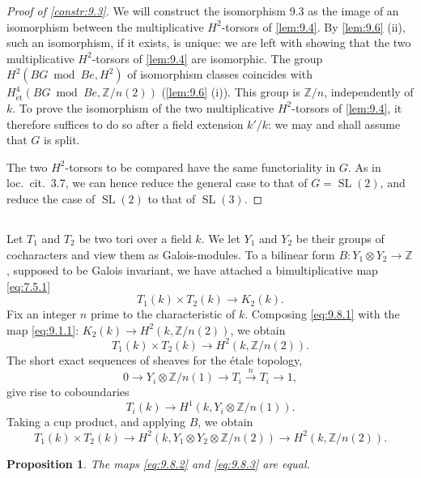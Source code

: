 \documentclass[11pt,a4paper]{article}
\theoremstyle{plain}
\newtheorem{proposition}[theorem]{Proposition}
\theoremstyle{definition}
\newcommand{\bZ}{\mathbb{Z}}
\DeclareMathOperator{\SL}{SL}
\newcommand{\et}{\mathrm{\acute{e}t}}
\begin{document}
\begin{proof}[Proof of \ref{constr:9.3}]
We will construct the isomorphism 9.3 as the image of an isomorphism between the multiplicative $H^2$-torsors of \ref{lem:9.4}. By \ref{lem:9.6} (ii), such an isomorphism, if it exists, is unique: we are left with showing that the two multiplicative $H^2$-torsors of \ref{lem:9.4} are isomorphic. The group $H^2(BG \bmod Be, H^2)$ of isomorphism classes coincides with $H^4_\et(BG \bmod Be, \bZ/n(2))$ (\ref{lem:9.6} (i)). This group is $\bZ/n$, independently of $k$. To prove the isomorphism of the two multiplicative $H^2$-torsors of \ref{lem:9.4}, it therefore suffices to do so after a field extension $k'/k$: we may and shall assume that $G$ is split.

The two $H^2$-torsors to be compared have the same functoriality in $G$. As in loc.~cit.~3.7, we can hence reduce the general case to that of $G = \SL(2)$, and reduce the case of $\SL(2)$ to that of $\SL(3)$.
\end{proof}

\subsection{}
Let $T_1$ and $T_2$ be two tori over a field $k$. We let $Y_1$ and $Y_2$ be their groups of cocharacters and view them as Galois-modules. To a bilinear form $B: Y_1 \otimes Y_2 \to \bZ$, supposed to be Galois invariant, we have attached a bimultiplicative map \eqref{eq:7.5.1}
\begin{equation}\label{eq:9.8.1}
T_1(k) \times T_2(k) \to K_2(k).
\end{equation}
Fix an integer $n$ prime to the characteristic of $k$. Composing \eqref{eq:9.8.1} with the map \eqref{eq:9.1.1}: $K_2(k) \to H^2(k, \bZ/n(2))$, we obtain
\begin{equation}\label{eq:9.8.2}
T_1(k) \times T_2(k) \to H^2(k, \bZ/n(2)).
\end{equation}
The short exact sequences of sheaves for the \'etale topology,
\[0 \to Y_i \otimes \bZ/n(1) \to T_i \xrightarrow{n} T_i \to 1,\]
give rise to coboundaries
\[T_i(k) \to H^1(k, Y_i \otimes \bZ/n(1)).\]
Taking a cup product, and applying $B$, we obtain
\begin{equation}\label{eq:9.8.3}
T_1(k) \times T_2(k) \to H^2(k, Y_1 \otimes Y_2 \otimes \bZ/n(2)) \to H^2(k, \bZ/n(2)).
\end{equation}

\begin{proposition}\label{prop:9.9}
The maps \eqref{eq:9.8.2} and \eqref{eq:9.8.3} are equal.
\end{proposition}
\end{document}
